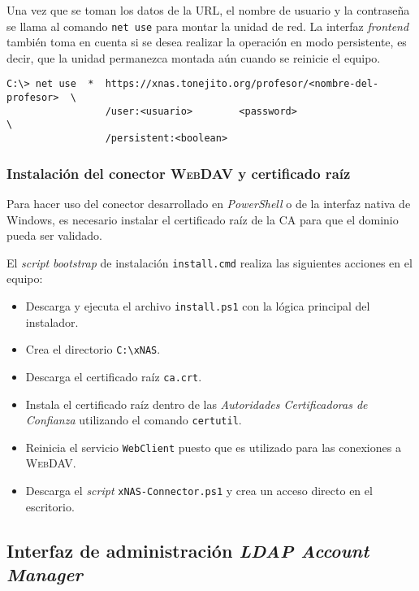 Una vez que se toman los datos de la \textsc{\gls{URL}}, el nombre de usuario y la contrase\~{n}a se llama al comando \texttt{net use} para montar la unidad de red. La interfaz \emph{\gls{frontend}} tambi\'{e}n toma en cuenta si se desea realizar la operaci\'{o}n en modo persistente, es decir, que la unidad permanezca montada a\'{u}n cuando se reinicie el equipo.

{
\footnotesize
\linespread{1}
\begin{verbatim}
C:\> net use  *  https://xnas.tonejito.org/profesor/<nombre-del-profesor>  \
                 /user:<usuario>        <password>                         \
                 /persistent:<boolean>
\end{verbatim}
}

\newpage
        \subsubsection {Instalaci\'{o}n del conector \textsc{WebDAV} y certificado ra\'{i}z}

Para hacer uso del conector desarrollado en \emph{\gls{PowerShell}} o de la interfaz nativa de Windows, es necesario instalar el certificado ra\'{i}z de la \textsc{\gls{CA}} para que el dominio pueda ser validado. 

El \emph{\gls{script}} \textit{\gls{bootstrap}} de instalaci\'{o}n \texttt{install.cmd} realiza las siguientes acciones en el equipo:

\begin{itemize}
  \item Descarga y ejecuta el archivo \texttt{install.ps1} con la l\'{o}gica principal del instalador.
  \item Crea el directorio \texttt{C:{\textbackslash}xNAS}.
  \item Descarga el certificado ra\'{i}z \texttt{ca.crt}.
  \item Instala el certificado ra\'{i}z dentro de las \emph{Autoridades Certificadoras de Confianza} utilizando el comando \texttt{certutil}.
  \item Reinicia el servicio \texttt{WebClient} puesto que es utilizado para las conexiones a \textsc{\gls{WebDAV}}.
  \item Descarga el \emph{\gls{script}} \texttt{xNAS-Connector.ps1} y crea un acceso directo en el escritorio.
\end{itemize}

      \subsection {Interfaz de administraci\'{o}n \textit{LDAP Account Manager}}

